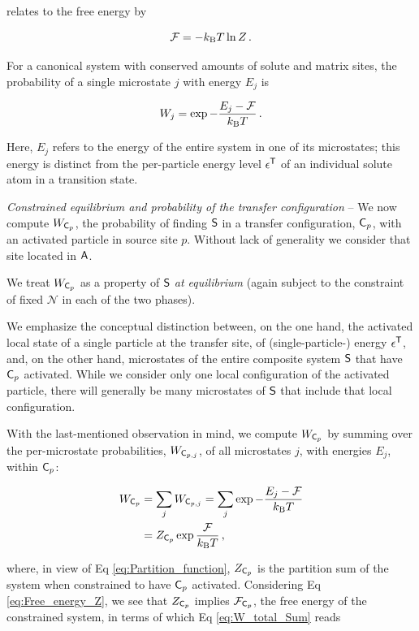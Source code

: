 \documentclass[english,aps,prb,showkeys,reprint]{revtex4-2}
\newcommand{\be}{\begin{equation}}
\newcommand{\ee}{\end{equation}}
\begin{document}
relates to the free energy by

\be
\label{eq:Free_energy_Z}
\mathcal{F} = - k_{\rm B} T \ln Z\,.
\ee


For a canonical system with conserved amounts of solute and matrix sites, the probability of a single microstate $j$ with energy $E_j$ is \cite[§16]{CallenThermodynamicsBook}\cite[§31]{LandauLifschitzBd5_1991}

\be
\label{eq:Boltzmanns_equation}
W_j =
\exp -\frac{E_j - \mathcal{F}}{k_{\rm B} T} \,.
\ee

Here, $E_j$ refers to the energy of the entire system in one of its microstates; this energy is distinct from the per-particle energy level $\epsilon^{\sf T}$ of an individual solute atom in a transition state.

\textit{Constrained equilibrium and probability of the transfer configuration}
--
We now compute $W_{{\sf C}_p}$, the probability of finding $\sf S$ in a transfer configuration, ${\sf C}_p$, with an activated particle in source site $p$. Without lack of generality we consider that site located in $\sf A$.

We treat $W_{{\sf C}_p}$ as a property of $\sf S$ \emph{at equilibrium} (again subject to the constraint of fixed $\mathcal N$ in each of the two phases).

We emphasize the conceptual distinction between, on the one hand, the activated local state of a single particle at the transfer site, of (single-particle-) energy $\epsilon^{\sf T}$, and, on the other hand, microstates of the entire composite system $\sf S$ that have ${\sf C}_p$ activated. While we consider only one local configuration of the activated particle, there will generally be many microstates of $\sf S$ that include that local configuration.

With the last-mentioned observation in mind, we compute $W_{{\sf C}_p}$ by summing over the per-microstate probabilities, $W_{{\sf C}_{p,j}}$, of all microstates $j$, with energies $E_j$, within ${\sf C}_p$:

\begin{align}
\nonumber
W_{{\sf C}_p}
&=
\sum_j W_{{\sf C}_{p,j}}
=
\sum_j \exp{ -\frac{E_j - \mathcal{F}}{k_{\rm B} T}} \\
&=
  Z_{{\sf C}_p} \exp\frac{\mathcal{F}}{k_{\rm B} T} \,,
\label{eq:W_total_Sum}
\end{align}

where, in view of Eq \ref{eq:Partition_function}, $ Z_{{\sf C}_p}$ is the partition sum of the system when constrained to have ${\sf C}_p$ activated. Considering Eq \ref{eq:Free_energy_Z}, we see that $ Z_{{\sf C}_p}$ implies $ \mathcal{F}_{{\sf C}_p}$, the free energy of the constrained system, in terms of which Eq \ref{eq:W_total_Sum} reads
\end{document}
